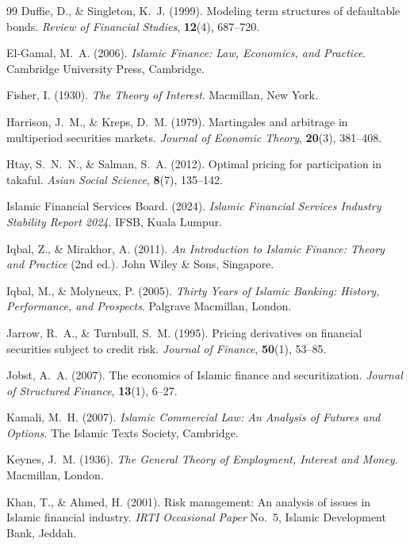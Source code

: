 \documentclass[10pt,twocolumn]{article}
\theoremstyle{plain}
\theoremstyle{definition}
\begin{document}
\begin{thebibliography}{99}
Duffie, D., \& Singleton, K.~J. (1999).
Modeling term structures of defaultable bonds.
\textit{Review of Financial Studies}, \textbf{12}(4), 687--720.

El-Gamal, M.~A. (2006).
\textit{Islamic Finance: Law, Economics, and Practice}.
Cambridge University Press, Cambridge.

Fisher, I. (1930).
\textit{The Theory of Interest}.
Macmillan, New York.

Harrison, J.~M., \& Kreps, D.~M. (1979).
Martingales and arbitrage in multiperiod securities markets.
\textit{Journal of Economic Theory}, \textbf{20}(3), 381--408.

Htay, S.~N.~N., \& Salman, S.~A. (2012).
Optimal pricing for participation in takaful.
\textit{Asian Social Science}, \textbf{8}(7), 135--142.

Islamic Financial Services Board. (2024).
\textit{Islamic Financial Services Industry Stability Report 2024}.
IFSB, Kuala Lumpur.

Iqbal, Z., \& Mirakhor, A. (2011).
\textit{An Introduction to Islamic Finance: Theory and Practice}
(2nd ed.).
John Wiley \& Sons, Singapore.

Iqbal, M., \& Molyneux, P. (2005).
\textit{Thirty Years of Islamic Banking: History, Performance,
and Prospects}.
Palgrave Macmillan, London.

Jarrow, R.~A., \& Turnbull, S.~M. (1995).
Pricing derivatives on financial securities subject to credit
risk.
\textit{Journal of Finance}, \textbf{50}(1), 53--85.

Jobst, A.~A. (2007).
The economics of Islamic finance and securitization.
\textit{Journal of Structured Finance}, \textbf{13}(1), 6--27.

Kamali, M.~H. (2007).
\textit{Islamic Commercial Law: An Analysis of Futures and Options}.
The Islamic Texts Society, Cambridge.

Keynes, J.~M. (1936).
\textit{The General Theory of Employment, Interest and Money}.
Macmillan, London.

Khan, T., \& Ahmed, H. (2001).
Risk management: An analysis of issues in Islamic financial
industry.
\textit{IRTI Occasional Paper} No.~5, Islamic Development Bank,
Jeddah.


\end{thebibliography}
\end{document}
